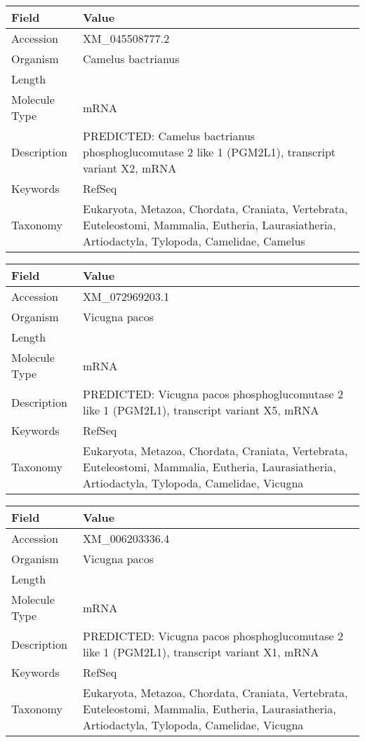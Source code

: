 \documentclass[10pt]{article}
\begin{document}
{\footnotesize
\begin{longtable}{>{\raggedright\arraybackslash}p{4.5cm} >{\raggedright\arraybackslash}p{11.5cm}}
\textbf{Field} & \textbf{Value} \\
\hline
Accession & XM\_045508777.2 \\
Organism & Camelus bactrianus \\
Length & 7230 \\
Molecule Type & mRNA \\
Description & PREDICTED: Camelus bactrianus phosphoglucomutase 2 like 1 (PGM2L1), transcript variant X2, mRNA \\
Keywords & RefSeq \\
Taxonomy & Eukaryota, Metazoa, Chordata, Craniata, Vertebrata, Euteleostomi, Mammalia, Eutheria, Laurasiatheria, Artiodactyla, Tylopoda, Camelidae, Camelus \\
\end{longtable}
}

{\footnotesize
\begin{longtable}{>{\raggedright\arraybackslash}p{4.5cm} >{\raggedright\arraybackslash}p{11.5cm}}
\textbf{Field} & \textbf{Value} \\
\hline
Accession & XM\_072969203.1 \\
Organism & Vicugna pacos \\
Length & 2203 \\
Molecule Type & mRNA \\
Description & PREDICTED: Vicugna pacos phosphoglucomutase 2 like 1 (PGM2L1), transcript variant X5, mRNA \\
Keywords & RefSeq \\
Taxonomy & Eukaryota, Metazoa, Chordata, Craniata, Vertebrata, Euteleostomi, Mammalia, Eutheria, Laurasiatheria, Artiodactyla, Tylopoda, Camelidae, Vicugna \\
\end{longtable}
}

{\footnotesize
\begin{longtable}{>{\raggedright\arraybackslash}p{4.5cm} >{\raggedright\arraybackslash}p{11.5cm}}
\textbf{Field} & \textbf{Value} \\
\hline
Accession & XM\_006203336.4 \\
Organism & Vicugna pacos \\
Length & 5787 \\
Molecule Type & mRNA \\
Description & PREDICTED: Vicugna pacos phosphoglucomutase 2 like 1 (PGM2L1), transcript variant X1, mRNA \\
Keywords & RefSeq \\
Taxonomy & Eukaryota, Metazoa, Chordata, Craniata, Vertebrata, Euteleostomi, Mammalia, Eutheria, Laurasiatheria, Artiodactyla, Tylopoda, Camelidae, Vicugna \\
\end{longtable}
}
\end{document}
